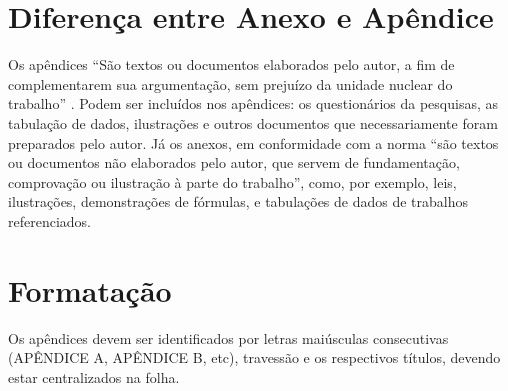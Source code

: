 
\begin{apendicesenv}
\partapendices  %

\chapter{Diferença entre Anexo e Apêndice}


Os apêndices ``São textos ou documentos elaborados pelo autor, a fim de complementarem sua argumentação, sem prejuízo da unidade nuclear do trabalho'' \cite{NBR14724:2011}. Podem ser incluídos nos apêndices:  os questionários da pesquisas, as tabulação de dados, ilustrações e outros documentos que necessariamente foram preparados pelo autor. Já os anexos, em conformidade com a norma \cite{NBR14724:2011}``são textos ou documentos não elaborados pelo autor, que servem de fundamentação, comprovação ou ilustração à parte do trabalho'', como, por exemplo, leis, ilustrações, demonstrações de fórmulas, e tabulações de dados de trabalhos referenciados.



\chapter{Formatação}

Os apêndices devem ser identificados por letras maiúsculas consecutivas (APÊNDICE A, APÊNDICE B, etc), travessão e os respectivos títulos, devendo estar centralizados na folha. 

\end{apendicesenv}
